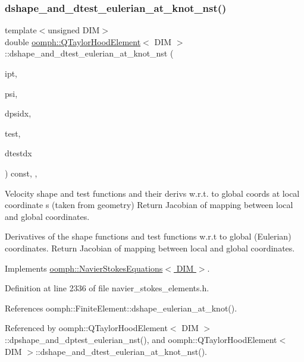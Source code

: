\subsubsection{\texorpdfstring{dshape\+\_\+and\+\_\+dtest\+\_\+eulerian\+\_\+at\+\_\+knot\+\_\+nst()}{dshape\_and\_dtest\_eulerian\_at\_knot\_nst()}\hspace{0.1cm}{\footnotesize\ttfamily [1/4]}}
{\footnotesize\ttfamily template$<$unsigned D\+IM$>$ \\
double \hyperlink{classoomph_1_1QTaylorHoodElement}{oomph\+::\+Q\+Taylor\+Hood\+Element}$<$ D\+IM $>$\+::dshape\+\_\+and\+\_\+dtest\+\_\+eulerian\+\_\+at\+\_\+knot\+\_\+nst (\begin{DoxyParamCaption}\item[{const unsigned \&}]{ipt,  }\item[{\hyperlink{classoomph_1_1Shape}{Shape} \&}]{psi,  }\item[{\hyperlink{classoomph_1_1DShape}{D\+Shape} \&}]{dpsidx,  }\item[{\hyperlink{classoomph_1_1Shape}{Shape} \&}]{test,  }\item[{\hyperlink{classoomph_1_1DShape}{D\+Shape} \&}]{dtestdx }\end{DoxyParamCaption}) const\hspace{0.3cm}{\ttfamily [inline]}, {\ttfamily [protected]}, {\ttfamily [virtual]}}



Velocity shape and test functions and their derivs w.\+r.\+t. to global coords at local coordinate s (taken from geometry) Return Jacobian of mapping between local and global coordinates. 

Derivatives of the shape functions and test functions w.\+r.\+t to global (Eulerian) coordinates. Return Jacobian of mapping between local and global coordinates. 

Implements \hyperlink{classoomph_1_1NavierStokesEquations_a46f9c15f162160fab6419f60ef619916}{oomph\+::\+Navier\+Stokes\+Equations$<$ D\+I\+M $>$}.



Definition at line 2336 of file navier\+\_\+stokes\+\_\+elements.\+h.



References oomph\+::\+Finite\+Element\+::dshape\+\_\+eulerian\+\_\+at\+\_\+knot().



Referenced by oomph\+::\+Q\+Taylor\+Hood\+Element$<$ D\+I\+M $>$\+::dpshape\+\_\+and\+\_\+dptest\+\_\+eulerian\+\_\+nst(), and oomph\+::\+Q\+Taylor\+Hood\+Element$<$ D\+I\+M $>$\+::dshape\+\_\+and\+\_\+dtest\+\_\+eulerian\+\_\+at\+\_\+knot\+\_\+nst().

